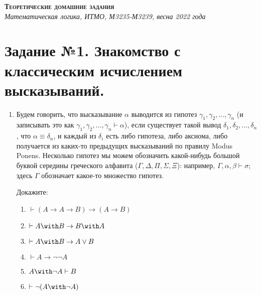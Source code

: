 \documentclass[10pt,a4paper,oneside]{article}
\begin{document}
\begin{center}{\Large\textsc{\textbf{Теоретические домашние задания}}}\\
             \it Математическая логика, ИТМО, М3235-М3239, весна 2022 года\end{center}

\section*{Задание №1. Знакомство с классическим исчислением высказываний.}

\begin{enumerate}

\item Будем говорить, что высказывание $\alpha$ выводится из гипотез $\gamma_1, \gamma_2, \dots, \gamma_n$
(и записывать это как $\gamma_1, \gamma_2, \dots, \gamma_n \vdash \alpha$), если существует
такой вывод $\delta_1, \delta_2, \dots, \delta_n$, что $\alpha\equiv\delta_n$, и каждый из $\delta_i$
есть либо гипотеза, либо аксиома, либо получается из каких-то предыдущих высказываний по правилу
Modus Ponens. Несколько гипотез мы можем обозначить какой-нибудь большой буквой середины греческого 
алфавита ($\Gamma,\Delta,\Pi,\Sigma,\Xi$): например, $\Gamma,\alpha,\beta\vdash\sigma$; здесь
$\Gamma$ обозначает какое-то множество гипотез.

Докажите:
\begin{enumerate}
\item $\vdash (A \rightarrow A \rightarrow B) \rightarrow (A \rightarrow B)$
\item $\vdash A \with B \rightarrow B \with A$
\item $\vdash A \with B \rightarrow A \vee B$
\item $\vdash A \rightarrow \neg \neg A$
\item $A \with \neg A \vdash B$
\item $\vdash \neg (A \with \neg A)$
\end{enumerate}


\end{enumerate}
\end{document}
